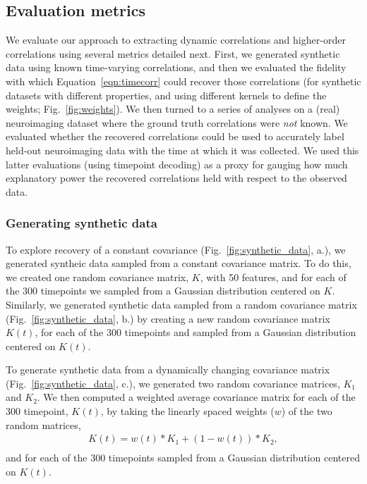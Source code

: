 \documentclass[english]{article}
\begin{document}
\subsection*{Evaluation metrics}
We evaluate our approach to extracting dynamic correlations and
higher-order correlations using several metrics detailed next.  First,
we generated synthetic data using known time-varying correlations, and
then we evaluated the fidelity with which Equation~\ref{eqn:timecorr}
could recover those correlations (for synthetic datasets with
different properties, and using different kernels to define the
weights; Fig.~\ref{fig:weights}).  We then turned to a series of
analyses on a (real) neuroimaging dataset where the ground truth
correlations were \textit{not} known.  We evaluated whether the
recovered correlations could be used to accurately label held-out
neuroimaging data with the time at which it was collected.  We used this latter evaluations (using timepoint
decoding) as a proxy for
gauging how much explanatory power the recovered correlations held
with respect to the observed data.

\subsubsection*{Generating synthetic data}
To explore recovery of a constant covariance (Fig.~\ref{fig:synthetic_data},  a.), we generated syntheic
data sampled from a constant covariance matrix. To do this, we created one random
covariance matrix, $K$, with 50 features, and for each of the 300 timepoints  we
sampled from a Gaussian distribution centered on $K$.  Similarly, we generated synthetic data
sampled from a random covariance matrix (Fig.~\ref{fig:synthetic_data}, b.) by creating a new random
covariance matrix $K(t)$, for each of the 300 timepoints and sampled from a
Gaussian distribution centered on $K(t)$.

To generate synthetic data from a dynamically changing covariance
matrix (Fig.~\ref{fig:synthetic_data},  c.),
we generated two random covariance
matrices, $K_{1}$ and $K_{2}$.  We then computed a weighted average covariance matrix
for each of the 300 timepoint, $K(t)$, 
by taking the linearly spaced weights ($w$) of the two random matrices, 
\begin{align}
K(t) = w(t) * K_{1} + (1 - w(t)) *  K_{2}, \\\label{eqn:ramping}
\end{align}
and for each of the 300 timepoints sampled from a
Gaussian distribution centered on $K(t)$.
\end{document}
